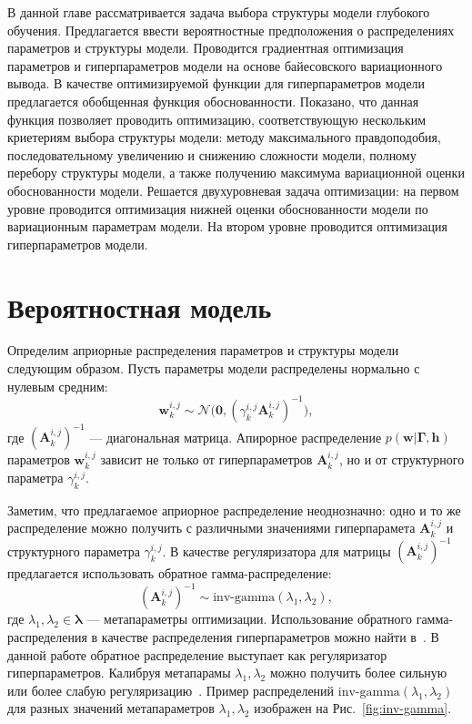 В данной главе рассматривается задача выбора структуры модели глубокого обучения. Предлагается ввести вероятностные предположения о распределениях параметров и структуры модели. 
Проводится градиентная оптимизация параметров и гиперпараметров модели на основе байесовского вариационного вывода.  В качестве оптимизируемой функции для гиперпараметров модели предлагается обобщенная функция обоснованности. Показано, что данная функция позволяет проводить оптимизацию, соответствующую нескольким криетериям выбора структуры модели: методу максимального правдоподобия, последовательному увеличению и снижению сложности модели, полному перебору структуры модели, а также получению максимума вариационной оценки обоснованности модели. Решается двухуровневая задача оптимизации: на первом уровне проводится оптимизация нижней оценки обоснованности модели по вариационным параметрам модели. На втором уровне проводится оптимизация гиперпараметров модели.

\section{Вероятностная модель}
Определим априорные распределения параметров и структуры модели следующим образом.
Пусть параметры модели распределены нормально с нулевым средним:
\[
    \mathbf{w}^{i,j}_k \sim \mathcal{N}\bigl(\mathbf{0}, (\gamma^{i,j}_k\mathbf{A}^{i,j}_k)^{-1}\bigr),
\]
где $ (\mathbf{A}^{i,j}_k)^{-1}$ --- диагональная матрица. Апирорное распределение $p(\mathbf{w}|\boldsymbol{\Gamma}, \mathbf{h})$ параметров $\mathbf{w}^{i,j}_k$ зависит не только от гиперпараметров $\mathbf{A}_k^{i,j}$, но и от структурного параметра $\gamma^{i,j}_k$.

Заметим, что предлагаемое априорное распределение неоднозначно: одно и то же распределение  можно получить с различными значениями гиперпарамета $\mathbf{A}^{i,j}_k$ и структурного параметра $\gamma^{i,j}_k$. В качестве регуляризатора для матрицы $(\mathbf{A}^{i,j}_k)^{-1}$ предлагается использовать обратное гамма-распределение:
\[
    (\mathbf{A}^{i,j}_k)^{-1} \sim \text{inv-gamma}(\lambda_1,\lambda_2),
\]
где $\lambda_1,\lambda_2 \in \boldsymbol{\lambda}$ --- метапараметры оптимизации. 
Использование обратного гамма-распределения в качестве распределения гиперпараметров можно найти в~\cite{bishop,mackay}. В данной работе обратное распределение выступает как регуляризатор гиперпараметров.
Калибруя метапарамы   $\lambda_1,\lambda_2$ можно получить более сильную или более слабую регуляризацию~\cite{rvm}. Пример распределений $\text{inv-gamma}(\lambda_1,\lambda_2)$ для разных значений метапараметров $\lambda_1,\lambda_2$ изображен на Рис.~\ref{fig:inv-gamma}.

